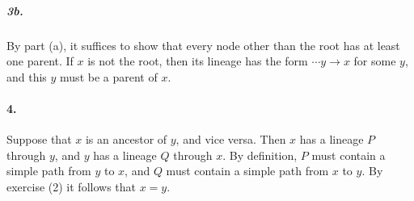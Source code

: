\documentclass[
]{article}
\begin{document}

\subparagraph{3b.} By part (a), it suffices to show that every node other than the root has at least one parent.  If $x$ is not the root, then its lineage has the form $\cdots y\to x$ for some $y$, and this $y$ must be a parent of $x$.

\paragraph{4.} Suppose that $x$ is an ancestor of $y$, and vice versa.  Then $x$ has a lineage $P$ through $y$, and $y$ has a lineage $Q$ through $x$.  By definition, $P$ must contain a simple path from $y$ to $x$, and $Q$ must contain a simple path from $x$ to $y$.  By exercise (2) it follows that $x=y$.  




\end{document}

